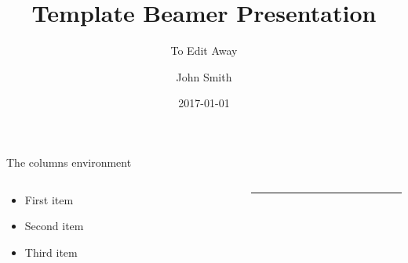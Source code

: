 \documentclass{beamer}
\title{Template Beamer Presentation}
\subtitle{To Edit Away}
\author{John Smith}
\institute[PCC]{Portland Community College}
\date{2017-01-01}
\begin{document}
\begin{frame}
  \maketitle
\end{frame}

\begin{frame}{The columns environment}
  \begin{columns}

  \begin{column}{0.47\textwidth}
    \begin{itemize}
      \item First item
      \item Second item
      \item Third item
    \end{itemize}
  \end{column}

  \begin{column}{0.5\textwidth}
    \rule{\textwidth}{0.75\textwidth}
  \end{column}

  \end{columns}
\end{frame}
\end{document}
